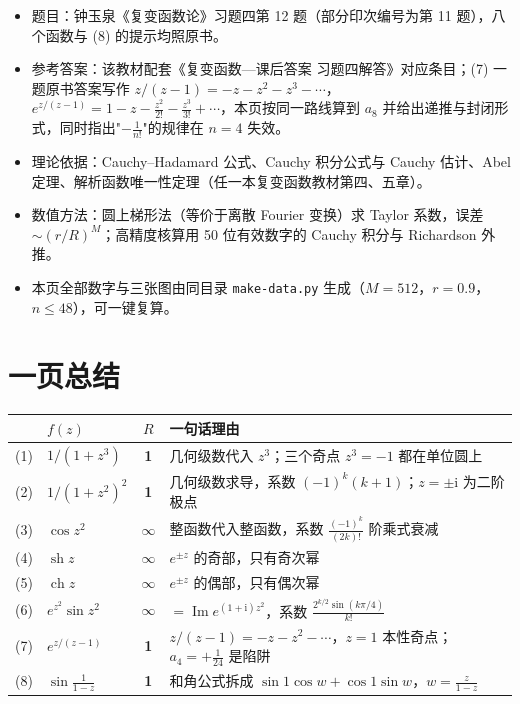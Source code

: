 \documentclass[11pt,a4paper]{ctexart}
\theoremstyle{definition}
\DeclareMathOperator{\Imag}{Im}
\providecommand{\sh}{\operatorname{sh}}
\providecommand{\ch}{\operatorname{ch}}
\newcommand{\ii}{\mathrm{i}}
\begin{document}
\begin{itemize}[leftmargin=1.6em,itemsep=0.2ex,topsep=0.3ex]
\item 题目：钟玉泉《复变函数论》习题四第 12 题（部分印次编号为第 11 题），八个函数与 (8) 的提示均照原书。
\item 参考答案：该教材配套《复变函数---课后答案 习题四解答》对应条目；(7) 一题原书答案写作 $z/(z-1)=-z-z^2-z^3-\cdots$，$e^{z/(z-1)}=1-z-\frac{z^2}{2!}-\frac{z^3}{3!}+\cdots$，本页按同一路线算到 $a_8$ 并给出递推与封闭形式，同时指出"$-\frac1{n!}$"的规律在 $n=4$ 失效。
\item 理论依据：Cauchy--Hadamard 公式、Cauchy 积分公式与 Cauchy 估计、Abel 定理、解析函数唯一性定理（任一本复变函数教材第四、五章）。
\item 数值方法：圆上梯形法（等价于离散 Fourier 变换）求 Taylor 系数，误差 $\sim(r/R)^M$；高精度核算用 50 位有效数字的 Cauchy 积分与 Richardson 外推。
\item 本页全部数字与三张图由同目录 \texttt{make-data.py} 生成（$M=512$，$r=0.9$，$n\le48$），可一键复算。
\end{itemize}

\clearpage
\section*{一页总结}

\begin{center}
\small
\setlength{\tabcolsep}{5pt}
\renewcommand{\arraystretch}{1.3}
\begin{tabular}{@{}c >{\raggedright\arraybackslash}p{3.4cm} c >{\raggedright\arraybackslash}p{8.0cm}@{}}
\toprule
& $f(z)$ & \boldmath$R$ & \textbf{一句话理由}\\
\midrule
(1) & $1/(1+z^3)$ & \textbf{1} & 几何级数代入 $z^3$；三个奇点 $z^3=-1$ 都在单位圆上\\
(2) & $1/(1+z^2)^2$ & \textbf{1} & 几何级数求导，系数 $(-1)^k(k+1)$；$z=\pm\ii$ 为二阶极点\\
(3) & $\cos z^2$ & $\boldsymbol{\infty}$ & 整函数代入整函数，系数 $\frac{(-1)^k}{(2k)!}$ 阶乘式衰减\\
(4) & $\sh z$ & $\boldsymbol{\infty}$ & $e^{\pm z}$ 的奇部，只有奇次幂\\
(5) & $\ch z$ & $\boldsymbol{\infty}$ & $e^{\pm z}$ 的偶部，只有偶次幂\\
(6) & $e^{z^2}\sin z^2$ & $\boldsymbol{\infty}$ & $=\Imag e^{(1+\ii)z^2}$，系数 $\frac{2^{k/2}\sin(k\pi/4)}{k!}$\\
(7) & $e^{z/(z-1)}$ & \textbf{1} & $z/(z-1)=-z-z^2-\cdots$，$z=1$ 本性奇点；$a_4=+\frac1{24}$ 是陷阱\\
(8) & $\sin\frac1{1-z}$ & \textbf{1} & 和角公式拆成 $\sin1\cos w+\cos1\sin w$，$w=\frac z{1-z}$\\
\bottomrule
\end{tabular}
\end{center}
\end{document}
